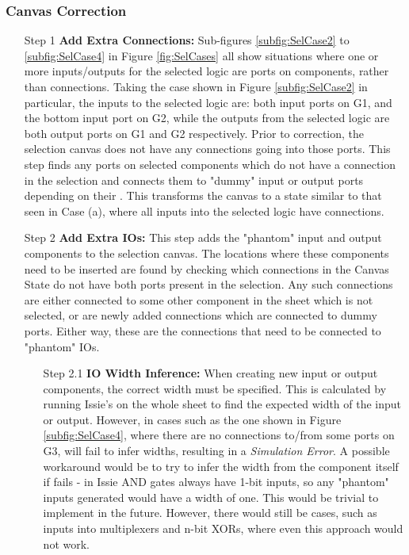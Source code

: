 
\subsubsection{Canvas Correction}
\begin{itemize}
    \item[Step 1] \textbf{Add Extra Connections:} Sub-figures \ref{subfig:SelCase2} to \ref{subfig:SelCase4} in Figure \ref{fig:SelCases} all show situations where one or more inputs/outputs for the selected logic are ports on components, rather than connections. Taking the case shown in Figure \ref{subfig:SelCase2} in particular, the inputs to the selected logic are: both input ports on G1, and the bottom input port on G2, while the outputs from the selected logic are both output ports on G1 and G2 respectively. Prior to correction, the selection canvas does not have any connections going into those ports. This step finds any ports on selected components which do not have a connection in the selection and connects them to "dummy" input or output ports depending on their . This transforms the canvas to a state similar to that seen in Case (a), where   all inputs into the selected logic have connections.
    \item[Step 2] \textbf{Add Extra IOs:} This step adds the "phantom" input and output components to the selection canvas. The locations where these components need to be inserted are found by checking which connections in the Canvas State do not have both ports present in the selection. Any such connections are either connected to some other component in the sheet which is not selected, or are newly added connections which are connected to dummy ports. Either way, these are the connections that need to be connected to "phantom" IOs. 
    \begin{itemize}
        \item[Step 2.1] \textbf{IO Width Inference:} When creating new input or output components, the correct width must be specified. This is         calculated by running Issie's  on the whole sheet to find the expected width of the input or output. However, in cases such as the one shown in Figure \ref{subfig:SelCase4}, where there are no connections to/from some ports on G3,  will fail to infer widths, resulting in a \textit{Simulation Error}. A possible workaround would be to try to infer the width from the component itself if  fails - in Issie AND gates always have 1-bit inputs, so any "phantom" inputs generated would have a width of one. This would be trivial to implement in the future. However, there would still be cases, such as inputs into multiplexers and n-bit XORs, where even this approach would not work.

\end{itemize}
\end{itemize}
